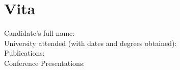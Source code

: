 \clearpage
{}  %
\chapter*{Vita}
\pagestyle{empty}
\thispagestyle{empty}
\singlespacing
Candidate's full name:\\
University attended (with dates and degrees obtained):\\
Publications:\\
Conference Presentations:
